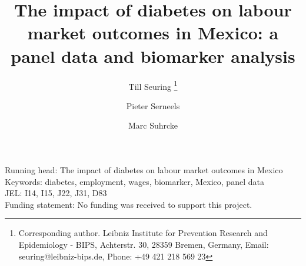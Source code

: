 \documentclass[12pt]{article}
\begin{document}
	\title{The impact of diabetes on labour market outcomes in Mexico: a panel data and biomarker analysis}
	
	\author[a,b]{Till Seuring%
		\thanks{Corresponding author. Leibniz Institute for Prevention Research and Epidemiology - BIPS, Achterstr. 30, 28359 Bremen, Germany, Email: seuring@leibniz-bips.de, Phone: +49 421 218 569 23}}
	\author[b]{Pieter Serneels}
	\author[c]{Marc Suhrcke}
	
	\date{}	
	
	
	
	\maketitle 
	
	\noindent Running head: The impact of diabetes on labour market outcomes in Mexico\\
	Keywords: diabetes, employment, wages, biomarker, Mexico, panel data\\
	JEL: I14, I15, J22, J31, D83\\
	Funding statement: No funding was received to support this project.
	\thispagestyle{empty}
	\clearpage
\end{document}
